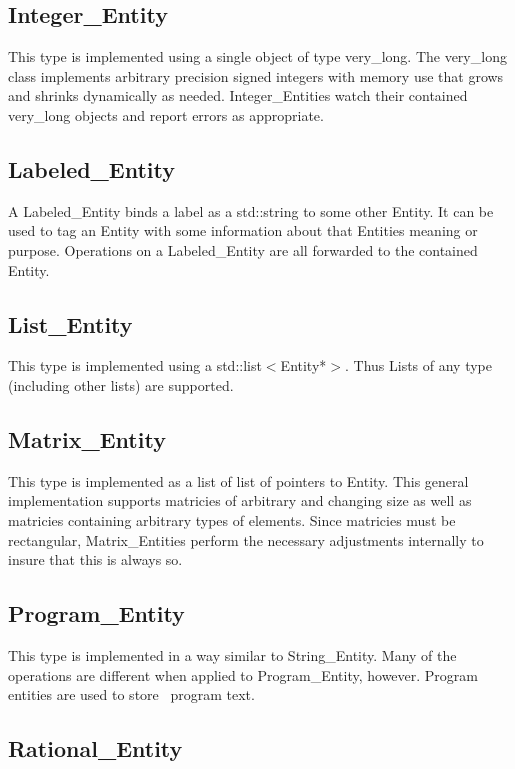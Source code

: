 \documentclass{report}
\begin{document}
\subsection{Integer\_Entity}

This type is implemented using a single object of type very\_long. The very\_long class
implements arbitrary precision signed integers with memory use that grows and shrinks
dynamically as needed. Integer\_Entities watch their contained very\_long objects and report
errors as appropriate.

\subsection{Labeled\_Entity}

A Labeled\_Entity binds a label as a std::string to some other Entity. It can be used to tag an
Entity with some information about that Entities meaning or purpose. Operations on a
Labeled\_Entity are all forwarded to the contained Entity.

\subsection{List\_Entity}

This type is implemented using a std::list$<$Entity*$>$. Thus Lists of any type (including other
lists) are supported.

\subsection{Matrix\_Entity}

This type is implemented as a list of list of pointers to Entity. This general implementation
supports matricies of arbitrary and changing size as well as matricies containing arbitrary
types of elements. Since matricies must be rectangular, Matrix\_Entities perform the necessary
adjustments internally to insure that this is always so.

\subsection{Program\_Entity}

This type is implemented in a way similar to String\_Entity. Many of the operations are
different when applied to Program\_Entity, however. Program entities are used to store \CLAC\
program text.

\subsection{Rational\_Entity}
\end{document}
